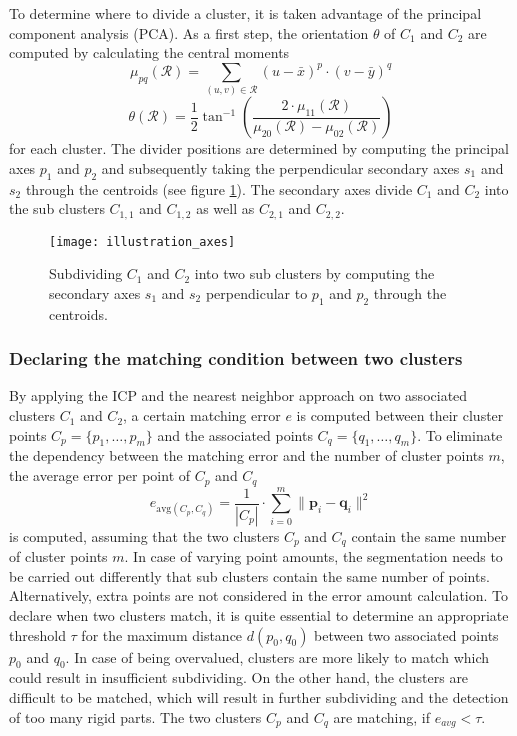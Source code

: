 To determine where to divide a cluster, it is taken advantage of the principal component analysis (PCA). As a first step, the orientation $\theta$ of $C_1$ and $C_2$ are computed by calculating the central moments
\begin{equation}
	\mu_{pq}(\mathcal{R}) = \sum_{(u,v)\in\mathcal{R}} (u - \bar{x})^p \cdot (v - \bar{y})^q
\end{equation}
\begin{equation}
	\theta(\mathcal{R}) = \frac{1}{2} \tan^{-1} \left(\frac{2\cdot \mu_{11}(\mathcal{R})}{\mu_{20}(\mathcal{R}) - \mu_{02}(\mathcal{R})}\right)
\end{equation}
for each cluster.	
The divider positions are determined by computing the principal axes $p_{1}$ and $p_{2}$ and subsequently taking the perpendicular secondary axes $s_{1}$ and $s_{2}$ through the centroids (see figure \ref{fig:dc_axes_2p}). The secondary axes divide $C_1$ and $C_2$ into the sub clusters $C_{1,1}$ and $C_{1,2}$ as well as $C_{2,1}$ and $C_{2,2}$.

\begin{figure}
	\centering
	\texttt{[image: illustration\_axes]}
	\caption{Subdividing $C_1$ and $C_2$ into two sub clusters by computing the secondary axes $s_1$ and $s_2$ perpendicular to $p_1$ and $p_2$ through the centroids.}
	\label{fig:dc_axes_2p}
\end{figure}

\subsubsection{Declaring the matching condition between two clusters}

By applying the ICP and the nearest neighbor approach on two associated clusters $C_1$ and $C_2$, a certain matching error $e$ is computed between their cluster points $ C_p =  \{ p_1, \ldots, p_m\}$ and the associated points $ C_q =  \{ q_1, \ldots, q_m\}$. To eliminate the dependency between the matching error and the number of cluster points $m$, the average error per point of $C_p$ and $C_q$
%
\begin{equation}
	e_{\mathrm{avg}(C_p, C_q)} = \frac{1}{| C_p |} \cdot \displaystyle\sum_{i=0}^{m}\| \boldsymbol{p}_i - \boldsymbol{q}_i\|^2
\end{equation}
%
is computed, assuming that the two clusters $C_p$ and $C_q$ contain the same number of cluster points $m$. In case of varying point amounts, the segmentation needs to be carried out differently that sub clusters contain the same number of points. Alternatively, extra points are not considered in the error amount calculation. To declare when two clusters match, it is quite essential to determine an appropriate threshold $\tau$ for the maximum distance $d(p_0, q_0)$ between two associated points $p_0$ and $q_0$. In case of being overvalued, clusters are more likely to match which could result in insufficient subdividing. On the other hand, the clusters are difficult to be matched, which will result in further subdividing and the detection of too many rigid parts. The two clusters $C_p$ and $C_q$ are matching, if $e_{avg} < \tau$.

